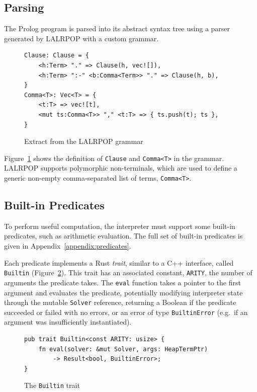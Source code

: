 \subsection{Parsing}

The Prolog program is parsed into its abstract syntax tree using a parser generated by LALRPOP \cite{thelalrpopprojectdevelopersLALRPOPhttpsgithubcom2015} with a custom grammar.

\begin{figure}[H]
\centering
\begin{verbatim}
Clause: Clause = {
    <h:Term> "." => Clause(h, vec![]),
    <h:Term> ":-" <b:Comma<Term>> "." => Clause(h, b),
}
Comma<T>: Vec<T> = {
    <t:T> => vec![t],
    <mut ts:Comma<T>> "," <t:T> => { ts.push(t); ts },
}
\end{verbatim}
\caption{Extract from the LALRPOP grammar}
\label{fig:grammar}
\end{figure}

\vspace*{-1.5em}

Figure~\ref{fig:grammar} shows the definition of \texttt{Clause} and \texttt{Comma<T>} in the grammar. LALRPOP supports polymorphic non-terminals, which are used to define a generic non-empty comma-separated list of terms, \texttt{Comma<T>}.

\subsection{Built-in Predicates}

\label{sec:builtins}

To perform useful computation, the interpreter must support some built-in predicates, such as arithmetic evaluation. The full set of built-in predicates is given in Appendix~\ref{appendix:predicates}.

Each predicate implements a Rust \emph{trait}, similar to a C++ interface, called \texttt{Builtin} (Figure~\ref{fig:builtin-trait}). This trait has an associated constant, \texttt{ARITY}, the number of arguments the predicate takes. The \texttt{eval} function takes a pointer to the first argument and evaluates the predicate, potentially modifying interpreter state through the mutable \texttt{Solver} reference, returning a Boolean if the predicate succeeded or failed with no errors, or an error of type \texttt{BuiltinError} (e.g.\ if an argument was insufficiently instantiated).

\begin{figure}[H]
\centering
\begin{verbatim}
pub trait Builtin<const ARITY: usize> {
    fn eval(solver: &mut Solver, args: HeapTermPtr)
        -> Result<bool, BuiltinError>;
}
\end{verbatim}
\caption{The \texttt{Builtin} trait}
\label{fig:builtin-trait}
\end{figure}

